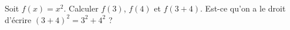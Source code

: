 
\begin{exercice}\label{exosmath-0178}

    Soit \( f(x)=x^2\). Calculer \( f(3)\), \( f(4)\) et \( f(3+4)\). Est-ce qu'on a le droit d'écrire \( (3+4)^2=3^2+4^2\) ?

\end{exercice}
